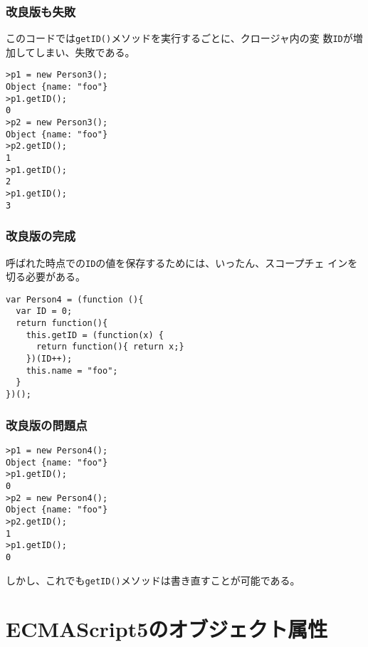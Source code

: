 \begin{frame}[containsverbatim]
\frametitle{改良版も失敗}
このコードでは\texttt{getID()}メソッドを実行するごとに、クロージャ内の変
数\texttt{ID}が増加してしまい、失敗である。
\begin{Verbatim}
>p1 = new Person3();
Object {name: "foo"}
>p1.getID();
0
>p2 = new Person3();
Object {name: "foo"}
>p2.getID();
1
>p1.getID();
2
>p1.getID();
3
\end{Verbatim}
\end{frame}
\begin{frame}[containsverbatim]
\frametitle{改良版の完成}
呼ばれた時点での\texttt{ID}の値を保存するためには、いったん、スコープチェ
インを切る必要がある。
\begin{Verbatim}
var Person4 = (function (){
  var ID = 0;
  return function(){
    this.getID = (function(x) {
      return function(){ return x;}
    })(ID++);
    this.name = "foo";
  }
})();
\end{Verbatim}
\end{frame}
\begin{frame}[containsverbatim]
\frametitle{改良版の問題点}
\begin{Verbatim}
>p1 = new Person4();
Object {name: "foo"}
>p1.getID();
0
>p2 = new Person4();
Object {name: "foo"}
>p2.getID();
1
>p1.getID();
0
\end{Verbatim}
しかし、これでも\texttt{getID()}メソッドは書き直すことが可能である。
\end{frame}
\section{ECMAScript5のオブジェクト属性}
